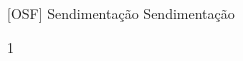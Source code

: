\documentclass["./OSF-Slides_annotations.tex"]{subfiles}
\begin{document}

[OSF]
{Sendimentação} %
{Sendimentação} %

\begin{sectionBox}1{} %
    
    
    
\end{sectionBox}
\end{document}
